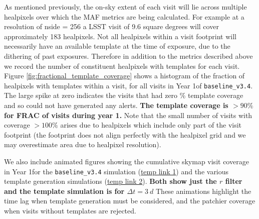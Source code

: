 \documentclass[preprint,linenumbers]{aastex631}
\newcommand{\baseline}{\texttt{baseline\_v3.4}\xspace}
\begin{document}
{		As mentioned previously, the on-sky extent of each visit will lie across multiple healpixels over which the MAF metrics are being calculated.
		For example at a resolution of nside = 256 a LSST visit of 9.6 square degrees will cover approximately 183 healpixels.
		Not all healpixels within a visit footprint will necessarily have an available template at the time of exposure, due to the dithering of past exposures.
		Therefore in addition to the metrics described above we record the number of constituent healpixels with templates for each visit.
		Figure \ref{fig:fractional_template_coverage} shows a histogram of the fraction of healpixels with templates within a visit, for all visits in Year 1of \baseline.
		The large spike at zero indicates the visits that had zero \% template coverage and so could not have generated any alerts.
		\textbf{The template coverage is $>90\%$ for FRAC of visits during year 1.}
		Note that the small number of visits with coverage $>100\%$ arises due to healpixels which include only part of the visit footprint (the footprint does not align perfectly with the healpixel grid and we may overestimate area due to healpixel resolution).
		
		We also include animated figures showing the cumulative skymap visit coverage in Year 1for the \baseline simulation (\href{https://uoe-my.sharepoint.com/:i:/g/personal/jrobin10_ed_ac_uk/EYo4E-4aDIhJlVPfUr-r7bEBHzUUZG5EYAiqQjVAz1u-dg?e=ar4exU}{temp link 1}) and the various template generation simulations (\href{https://uoe-my.sharepoint.com/:i:/g/personal/jrobin10_ed_ac_uk/EWMteDuQN6pKsADBES4XXWUBO9ArRd2cQGFxMVo1IrsGmg?e=iMlYe2}{temp link 2}).
		\textbf{Both show just the $r$ filter and the template simulation is for $\Delta t = 3\ \si{d}$}
		These animations highlight the time lag when template generation must be considered, and the patchier coverage when visits without templates are rejected.
		
}
\end{document}
